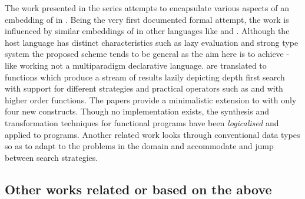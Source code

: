 \documentclass[thesis-solanki.tex]{subfiles}
\begin{document}
The work presented in the series
\cite{spivey1999embedding,seres1999algebra,seres2001higher,spivey1999algebra,seres2001algebra} attempts to
encapsulate various aspects of an embedding of  in .
Being the very first documented formal attempt, the work is influenced by similar embeddings of 
in other languages like  and .
Although the host language has distinct characteristics such as lazy evaluation and strong type system the proposed
scheme tends to be general as the aim here is to achieve -like working not a multiparadigm
declarative language.
  are translated to  functions which produce a
stream of results lazily depicting depth first search with support for different strategies and practical operators
such as  and  with higher order functions.
The papers provide a minimalistic extension to  with only four new constructs.
Though no implementation exists, the synthesis and transformation techniques for functional programs have been
\textit{logicalised} and applied to  programs.
Another related work \cite{spivey2000functional} looks through conventional data types so as to adapt to the
problems in the domain and accommodate and jump between search strategies.


\subsection{Other works related or based on the above}

\end{document}
